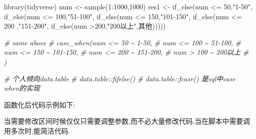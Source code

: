 \documentclass[
]{book}
\newenvironment{Shaded}{\begin{snugshade}}{\end{snugshade}}
\newcommand{\CommentTok}[1]{\textcolor[rgb]{0.56,0.35,0.01}{\textit{#1}}}
\newcommand{\DecValTok}[1]{\textcolor[rgb]{0.00,0.00,0.81}{#1}}
\newcommand{\FunctionTok}[1]{\textcolor[rgb]{0.00,0.00,0.00}{#1}}
\newcommand{\NormalTok}[1]{#1}
\newcommand{\OtherTok}[1]{\textcolor[rgb]{0.56,0.35,0.01}{#1}}
\newcommand{\SpecialCharTok}[1]{\textcolor[rgb]{0.00,0.00,0.00}{#1}}
\newcommand{\StringTok}[1]{\textcolor[rgb]{0.31,0.60,0.02}{#1}}
\begin{document}
\begin{Shaded}
\begin{Highlighting}[]
\FunctionTok{library}\NormalTok{(tidyverse)}
\NormalTok{num }\OtherTok{\textless{}{-}} \FunctionTok{sample}\NormalTok{(}\DecValTok{1}\SpecialCharTok{:}\DecValTok{1000}\NormalTok{,}\DecValTok{1000}\NormalTok{)}
\NormalTok{res1 }\OtherTok{\textless{}{-}} \FunctionTok{if\_else}\NormalTok{(num }\SpecialCharTok{\textless{}=} \DecValTok{50}\NormalTok{,}\StringTok{"1{-}50"}\NormalTok{,}
                \FunctionTok{if\_else}\NormalTok{(num }\SpecialCharTok{\textless{}=} \DecValTok{100}\NormalTok{,}\StringTok{"51{-}100"}\NormalTok{,}
                        \FunctionTok{if\_else}\NormalTok{(num }\SpecialCharTok{\textless{}=} \DecValTok{150}\NormalTok{,}\StringTok{"101{-}150"}\NormalTok{,}
                                \FunctionTok{if\_else}\NormalTok{(num }\SpecialCharTok{\textless{}=} \DecValTok{200}\NormalTok{ ,}\StringTok{"151{-}200"}\NormalTok{,}
                                        \FunctionTok{if\_else}\NormalTok{(num }\SpecialCharTok{\textgreater{}}\DecValTok{200}\NormalTok{,}\StringTok{"200以上"}\NormalTok{,}\StringTok{\textquotesingle{}其他\textquotesingle{}}\NormalTok{)))))}


\CommentTok{\# same above}
\CommentTok{\# case\_when(num \textless{}= 50 \textasciitilde{} \textquotesingle{}1{-}50\textquotesingle{},}
\CommentTok{\#           num \textless{}= 100 \textasciitilde{} \textquotesingle{}51{-}100\textquotesingle{},}
\CommentTok{\#           num \textless{}= 150 \textasciitilde{} \textquotesingle{}101{-}150\textquotesingle{},}
\CommentTok{\#           num \textless{}= 200 \textasciitilde{} \textquotesingle{}151{-}200\textquotesingle{},}
\CommentTok{\#           num \textgreater{} 100 \textasciitilde{} \textquotesingle{}200以上\textquotesingle{}}
\CommentTok{\#           )}

\CommentTok{\# 个人倾向data.table }
\CommentTok{\# data.table::fifelse()}
\CommentTok{\# data.table::fcase() 是sql中case when的实现}
\end{Highlighting}
\end{Shaded}

函数化后代码示例如下:

当需要修改区间时候仅仅只需要调整参数,而不必大量修改代码,当在脚本中需要调用多次时,能简洁代码.
\end{document}
